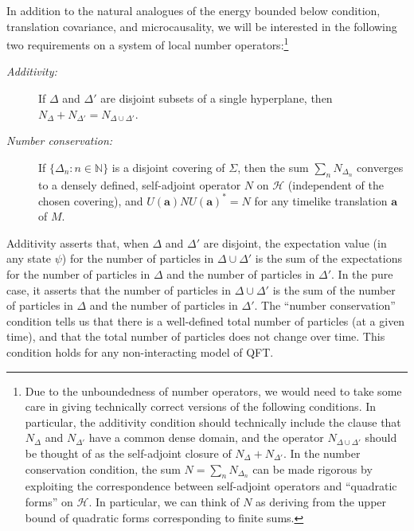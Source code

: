 \documentclass[11pt]{article}
\theoremstyle{remark}
\newcommand{\hil}[1]{\mathcal{#1}}
\begin{document}
In addition to the natural analogues of the energy bounded below
condition, translation covariance, and microcausality, we will be
interested in the following two requirements on a system of local
number operators:\footnote{Due to the unboundedness of number
  operators, we would need to take some care in giving technically
  correct versions of the following conditions.  In particular, the
  additivity condition should technically include the clause that
  $N_{\Delta}$ and $N_{\Delta '}$ have a common dense domain, and the
  operator $N_{\Delta \cup \Delta '}$ should be thought of as the
  self-adjoint closure of $N_{\Delta}+N_{\Delta '}$.  In the number
  conservation condition, the sum $N=\sum _{n}N_{\Delta _{n}}$ can be
  made rigorous by exploiting the correspondence between self-adjoint
  operators and ``quadratic forms'' on $\hil{H}$.  In particular, we
  can think of $N$ as deriving from the upper bound of quadratic forms
  corresponding to finite sums.}
\begin{description}
\item[{\it Additivity:}] If $\Delta$ and $\Delta '$ are disjoint
  subsets of a single hyperplane, then \newline $N_{\Delta}+N_{\Delta
    '}=N_{\Delta \cup \Delta '}$.
\item[{\it Number conservation:}] If $\{ \Delta _{n}:n\in \mathbb{N}
  \}$ is a disjoint covering of $\Sigma$, then the sum $\sum
  _{n}N_{\Delta _{n}}$ converges to a densely defined, self-adjoint
  operator $N$ on $\hil{H}$ (independent of the chosen covering), and
  $U(\mathbf{a})NU(\mathbf{a})^{*}=N$ for any timelike translation
  $\mathbf{a}$ of $M$.
\end{description}
Additivity asserts that, when $\Delta$ and $\Delta '$ are disjoint,
the expectation value (in any state $\psi$) for the number of
particles in $\Delta \cup \Delta '$ is the sum of the expectations for
the number of particles in $\Delta$ and the number of particles in
$\Delta '$.  In the pure case, it asserts that the number of particles
in $\Delta \cup \Delta '$ is the sum of the number of particles in
$\Delta$ and the number of particles in $\Delta '$.  The ``number
conservation'' condition tells us that there is a well-defined total
number of particles (at a given time), and that the total number of
particles does not change over time.  This condition holds for any
non-interacting model of QFT.  
\end{document}
